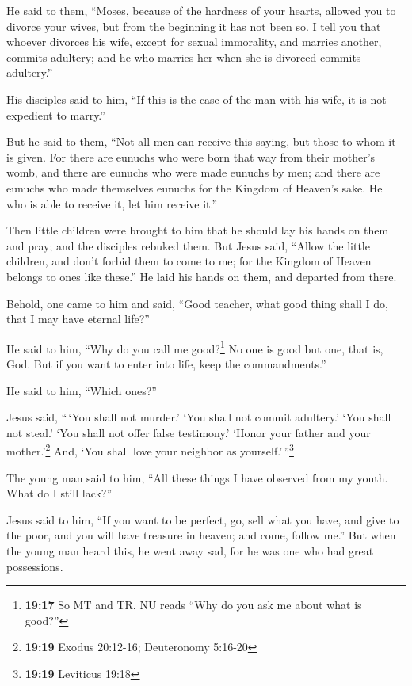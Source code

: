  He said to them, ``Moses, because of the hardness of your
hearts, allowed you to divorce your wives, but from the beginning it has
not been so.  I tell you that whoever divorces his wife,
except for sexual immorality, and marries another, commits adultery; and
he who marries her when she is divorced commits adultery.''

 His disciples said to him, ``If this is the case of the
man with his wife, it is not expedient to marry.''

 But he said to them, ``Not all men can receive this
saying, but those to whom it is given.  For there are
eunuchs who were born that way from their mother's womb, and there are
eunuchs who were made eunuchs by men; and there are eunuchs who made
themselves eunuchs for the Kingdom of Heaven's sake. He who is able to
receive it, let him receive it.''

 Then little children were brought to him that he should
lay his hands on them and pray; and the disciples rebuked them.
 But Jesus said, ``Allow the little children, and don't
forbid them to come to me; for the Kingdom of Heaven belongs to ones
like these.''  He laid his hands on them, and departed
from there.

 Behold, one came to him and said, ``Good teacher, what
good thing shall I do, that I may have eternal life?''

 He said to him, ``Why do you call me good?\footnote{\textbf{19:17}
  So MT and TR. NU reads ``Why do you ask me about what is good?''} No
one is good but one, that is, God. But if you want to enter into life,
keep the commandments.''

 He said to him, ``Which ones?''

Jesus said, ``\,`You shall not murder.' `You shall not commit adultery.'
`You shall not steal.' `You shall not offer false testimony.'
 `Honor your father and your mother.'\footnote{\textbf{19:19}
  Exodus 20:12-16; Deuteronomy 5:16-20} And, `You shall love your
neighbor as yourself.'\,''\footnote{\textbf{19:19} Leviticus 19:18}

 The young man said to him, ``All these things I have
observed from my youth. What do I still lack?''

 Jesus said to him, ``If you want to be perfect, go, sell
what you have, and give to the poor, and you will have treasure in
heaven; and come, follow me.''  But when the young man
heard this, he went away sad, for he was one who had great possessions.

